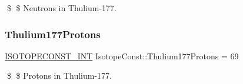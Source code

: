 \$ \$ Neutrons in Thulium-\/177. \mbox{\label{group___isotope_const-_thulium-_tm177_gada5a37170daa9c90e4cee6c815641ecb}} 
\subsubsection{\texorpdfstring{Thulium177\+Protons}{Thulium177Protons}}
{\footnotesize\ttfamily \mbox{\hyperlink{group___isotope_const-_macros_ga5f18360b3e99483a35c32d789e62621c}{I\+S\+O\+T\+O\+P\+E\+C\+O\+N\+S\+T\+\_\+\+I\+NT}} Isotope\+Const\+::\+Thulium177\+Protons = 69}

\$ \$ Protons in Thulium-\/177. 